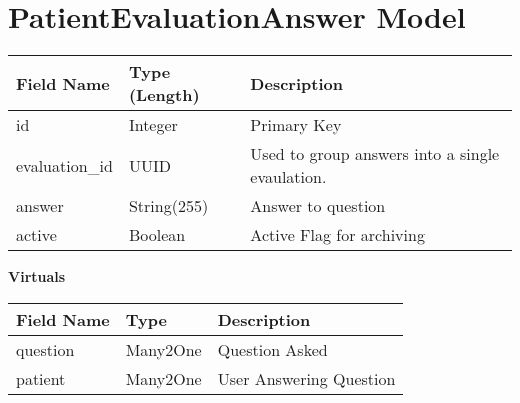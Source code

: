 \documentclass[letterpaper,10pt,english]{sphinxmanual}
\begin{document}
\section{PatientEvaluationAnswer Model}
\label{dev-models:patientevaluationanswer-model-label}\label{dev-models:patientevaluationanswer-model}
\begin{tabulary}{\linewidth}{|L|L|L|}
\hline
\textsf{\relax 
Field Name
} & \textsf{\relax 
Type (Length)
} & \textsf{\relax 
Description
}\\
\hline
id
 & 
Integer
 & 
Primary Key
\\

evaluation\_id
 & 
UUID
 & 
Used to group answers into a single
evaulation.
\\

answer
 & 
String(255)
 & 
Answer to question
\\

active
 & 
Boolean
 & 
Active Flag for archiving
\\
\hline\end{tabulary}


\textbf{Virtuals}

\begin{tabulary}{\linewidth}{|L|L|L|}
\hline
\textsf{\relax 
Field Name
} & \textsf{\relax 
Type
} & \textsf{\relax 
Description
}\\
\hline
question
 & 
Many2One
 & 
Question Asked
\\

patient
 & 
Many2One
 & 
User Answering Question
\\
\hline\end{tabulary}
\end{document}
